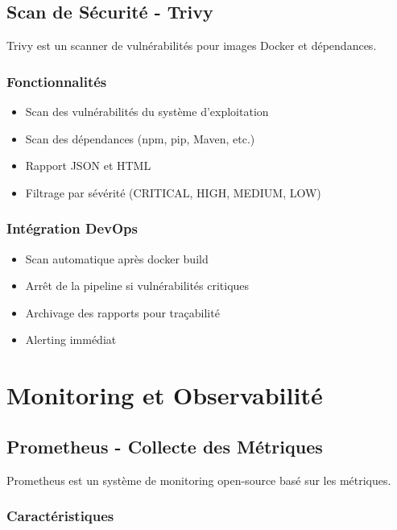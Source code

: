 \documentclass[12pt,a4paper]{report}
\begin{document}
\subsection{Scan de Sécurité - Trivy}

Trivy est un scanner de vulnérabilités pour images Docker et dépendances.

\subsubsection{Fonctionnalités}

\begin{itemize}
    \item Scan des vulnérabilités du système d'exploitation
    \item Scan des dépendances (npm, pip, Maven, etc.)
    \item Rapport JSON et HTML
    \item Filtrage par sévérité (CRITICAL, HIGH, MEDIUM, LOW)
\end{itemize}

\subsubsection{Intégration DevOps}

\begin{itemize}
    \item Scan automatique après docker build
    \item Arrêt de la pipeline si vulnérabilités critiques
    \item Archivage des rapports pour traçabilité
    \item Alerting immédiat
\end{itemize}

\section{Monitoring et Observabilité}

\subsection{Prometheus - Collecte des Métriques}

Prometheus est un système de monitoring open-source basé sur les métriques.

\subsubsection{Caractéristiques}
\end{document}
